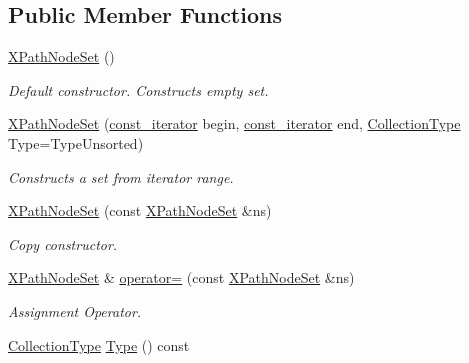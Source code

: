 \subsection*{Public Member Functions}
\begin{DoxyCompactItemize}
\item 
\hypertarget{classphys_1_1xml_1_1XPathNodeSet_a24b0e325cd45548e3f63bd37557eab93}{
\hyperlink{classphys_1_1xml_1_1XPathNodeSet_a24b0e325cd45548e3f63bd37557eab93}{XPathNodeSet} ()}
\label{de/dc2/classphys_1_1xml_1_1XPathNodeSet_a24b0e325cd45548e3f63bd37557eab93}

\begin{DoxyCompactList}\small\item\em Default constructor. Constructs empty set. \item\end{DoxyCompactList}\item 
\hyperlink{classphys_1_1xml_1_1XPathNodeSet_a4184ec067744749dd044f7740d2dc6e3}{XPathNodeSet} (\hyperlink{classphys_1_1xml_1_1XPathNode}{const\_\-iterator} begin, \hyperlink{classphys_1_1xml_1_1XPathNode}{const\_\-iterator} end, \hyperlink{classphys_1_1xml_1_1XPathNodeSet_ab178d39e119369702541033c067a995c}{CollectionType} Type=TypeUnsorted)
\begin{DoxyCompactList}\small\item\em Constructs a set from iterator range. \item\end{DoxyCompactList}\item 
\hyperlink{classphys_1_1xml_1_1XPathNodeSet_af4ac7af973425828bd66dc278887695c}{XPathNodeSet} (const \hyperlink{classphys_1_1xml_1_1XPathNodeSet}{XPathNodeSet} \&ns)
\begin{DoxyCompactList}\small\item\em Copy constructor. \item\end{DoxyCompactList}\item 
\hyperlink{classphys_1_1xml_1_1XPathNodeSet}{XPathNodeSet} \& \hyperlink{classphys_1_1xml_1_1XPathNodeSet_a10ab6b5b2188af5d7db6930473fa0190}{operator=} (const \hyperlink{classphys_1_1xml_1_1XPathNodeSet}{XPathNodeSet} \&ns)
\begin{DoxyCompactList}\small\item\em Assignment Operator. \item\end{DoxyCompactList}\item 
\hyperlink{classphys_1_1xml_1_1XPathNodeSet_ab178d39e119369702541033c067a995c}{CollectionType} \hyperlink{classphys_1_1xml_1_1XPathNodeSet_a95c90708290e045ef04425a71b2ddf25}{Type} () const 

\end{DoxyCompactItemize}
